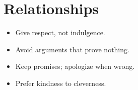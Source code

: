 \documentclass[11pt,a4paper]{article} %
\begin{document}
\section{Relationships}
\begin{itemize}[leftmargin=*]
\item Give respect, not indulgence.
\item Avoid arguments that prove nothing.
\item Keep promises; apologize when wrong.
\item Prefer kindness to cleverness.
\end{itemize}
\end{document}
